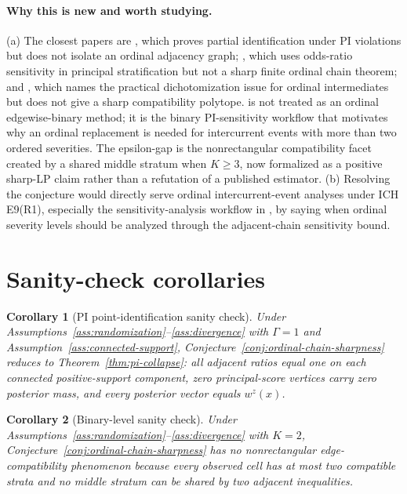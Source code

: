 \documentclass[11pt]{article}
\theoremstyle{definition}
\theoremstyle{plain}
\newtheorem{corollary}{Corollary}
\theoremstyle{remark}
\begin{document}
\paragraph{Why this is new and worth studying.}
(a) The closest papers are \citet{WuAntonelli2024}, which proves partial identification under PI violations but does not isolate an ordinal adjacency graph; \citet{TongKahanHarhayLi2025}, which uses odds-ratio sensitivity in principal stratification but not a sharp finite ordinal chain theorem; and \citet{VanderWeele2011}, which names the practical dichotomization issue for ordinal intermediates but does not give a sharp compatibility polytope.  \citet{WangZhangMealliBornkamp2023} is not treated as an ordinal edgewise-binary method; it is the binary PI-sensitivity workflow that motivates why an ordinal replacement is needed for intercurrent events with more than two ordered severities.  The epsilon-gap is the nonrectangular compatibility facet created by a shared middle stratum when \(K\ge3\), now formalized as a positive sharp-LP claim rather than a refutation of a published estimator.  (b) Resolving the conjecture would directly serve ordinal intercurrent-event analyses under ICH E9(R1), especially the sensitivity-analysis workflow in \citet{WangZhangMealliBornkamp2023}, by saying when ordinal severity levels should be analyzed through the adjacent-chain sensitivity bound.

\section{Sanity-check corollaries}
\begin{corollary}[PI point-identification sanity check]\label{cor:pi}
Under Assumptions~\ref{ass:randomization}--\ref{ass:divergence} with \(\Gamma=1\) and Assumption~\ref{ass:connected-support}, Conjecture~\ref{conj:ordinal-chain-sharpness} reduces to Theorem~\ref{thm:pi-collapse}: all adjacent ratios equal one on each connected positive-support component, zero principal-score vertices carry zero posterior mass, and every posterior vector equals \(w^z(x)\).
\end{corollary}

\begin{corollary}[Binary-level sanity check]\label{cor:binary}
Under Assumptions~\ref{ass:randomization}--\ref{ass:divergence} with \(K=2\), Conjecture~\ref{conj:ordinal-chain-sharpness} has no nonrectangular edge-compatibility phenomenon because every observed cell has at most two compatible strata and no middle stratum can be shared by two adjacent inequalities.
\end{corollary}
\end{document}
